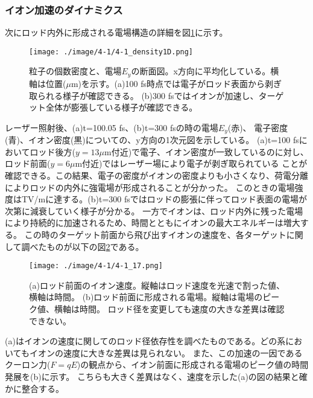 \documentclass[a4paper,11pt,titlepage]{jsarticle}
\begin{document}
    \subsubsection{イオン加速のダイナミクス}
    次にロッド内外に形成される電場構造の詳細を図\ref{fig:4-1_density1D}に示す。
    \begin{figure}[H]
      \begin{center}
        \texttt{[image: ./image/4-1/4-1\_density1D.png]}
        \caption{
          \label{fig:4-1_density1D}
            粒子の個数密度と、電場$E_y$の断面図。x方向に平均化している。横軸は位置($\mu$m)を示す。(a)100 fs時点では電子がロッド表面から剥ぎ取られる様子が確認できる。
            (b)300 fsではイオンが加速し、ターゲット全体が膨張している様子が確認できる。
        }
      \end{center}
    \end{figure}
    レーザー照射後、(a)t=100.05 fs、(b)t=300 fsの時の電場$E_y$(赤)、
    電子密度(青)、イオン密度(黒)についての、y方向の1次元図を示している。
    (a)t=100 fsにおいてロッド後方($y=13 \mu$m付近)で電子、イオン密度が一致しているのに対し、ロッド前面($y=6 \mu$m付近)ではレーザー場により電子が剥ぎ取られている
    ことが確認できる。この結果、電子の密度がイオンの密度よりも小さくなり、荷電分離によりロッドの内外に強電場が形成されることが分かった。
    このときの電場強度はTV/mに達する。(b)t=300 fsではロッドの膨張に伴ってロッド表面の電場が次第に減衰していく様子が分かる。
    一方でイオンは、ロッド内外に残った電場により持続的に加速されるため、時間とともにイオンの最大エネルギーは増大する。
    この時のターゲット前面から飛び出すイオンの速度を、各ターゲットに関して調べたものが以下の図\ref{fig:4-1_17}である。
    \begin{figure}[H]
      \begin{center}
        \texttt{[image: ./image/4-1/4-1\_17.png]}
        \caption{
          \label{fig:4-1_17}
           (a)ロッド前面のイオン速度。縦軸はロッド速度を光速で割った値、横軸は時間。
           (b)ロッド前面に形成される電場。縦軸は電場のピーク値、横軸は時間。
           ロッド径を変更しても速度の大きな差異は確認できない。
        }
      \end{center}
    \end{figure}
    (a)はイオンの速度に関してのロッド径依存性を調べたものである。どの系においてもイオンの速度に大きな差異は見られない。
    また、この加速の一因であるクーロン力($F=qE$)の観点から、イオン前面に形成される電場のピーク値の時間発展を(b)に示す。
    こちらも大きく差異はなく、速度を示した(a)の図の結果と確かに整合する。
\end{document}
